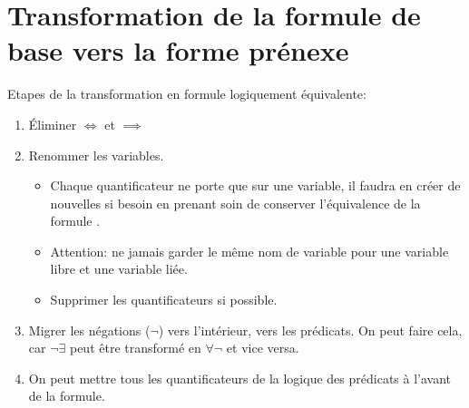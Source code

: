 {\section{Transformation de la formule de base vers la forme prénexe}

Etapes de la transformation en formule logiquement équivalente:
\begin{enumerate}
    \item Éliminer $\Leftrightarrow$ et $\implies{}$
    \item Renommer les variables. 
    \begin{itemize}
    \item Chaque quantificateur ne porte que sur une variable, il faudra en créer de nouvelles si besoin en prenant soin de conserver l'équivalence de la formule . 
    \item Attention: ne jamais garder le même nom de variable pour une variable libre et une variable liée. 
    \item Supprimer les quantificateurs si possible. \\
    \end{itemize}
    \item Migrer les négations ($\neg$) vers l'intérieur, vers les prédicats. On peut faire cela, car $\neg\exists$ peut être transformé en $\forall\neg$ et vice versa.  
    \item On peut mettre tous les quantificateurs de la logique des prédicats à l'avant de la formule. 
\end{enumerate}
}
